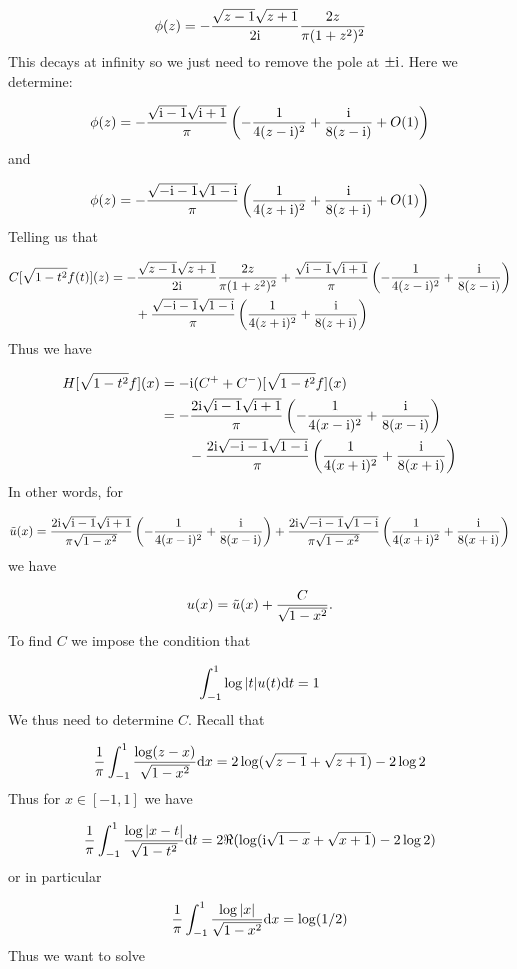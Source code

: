 \documentclass[12pt,landscape]{article}
\def\D{ {\rm d} }
\def\I{ {\rm i} }
\def\addtab#1={#1\;&=}
\def\ccr{\\\addtab}
\def\dx{\D x}
\def\dt{\D t}
\def\addtab#1={#1\;&=}
\def\ccr{\\\addtab}
\begin{document}
{\[
\phi(z) = -{\sqrt{z-1} \sqrt{z+1} \over 2 \I} {2 z \over \pi (1+z^2)^2}
\]
This decays at infinity so we just need to remove the pole at $\pm \I$. Here we determine:

\[
\phi(z) = -{\sqrt{\I -1 } \sqrt{\I + 1} \over \pi} \left(-{1  \over 4 (z-\I)^2}  + {\I \over 8  (z-\I)} + O(1) \right)
\]
and

\[
\phi(z) = -{\sqrt{-\I -1 } \sqrt{1-\I } \over \pi} \left({1  \over 4 (z+\I)^2}  + {\I \over 8  (z+\I)} + O(1) \right)
\]
Telling us that


\begin{align*}
C[\sqrt{1-t^2} f(t)](z) &=  -{\sqrt{z-1} \sqrt{z+1} \over 2 \I} {2 z \over \pi (1+z^2)^2} +  {\sqrt{\I -1 } \sqrt{\I + 1} \over \pi} \left(-{1  \over 4 (z-\I)^2}  + {\I \over 8  (z-\I)} \right) \\
&\qquad+  {\sqrt{-\I -1 } \sqrt{1-\I } \over \pi} \left({1  \over 4 (z+\I)^2}  + {\I \over 8  (z+\I)} \right)
\end{align*}
Thus we have


\begin{align*}
H[\sqrt{1-t^2} f](x) &= -\I (C^+ + C^-)[\sqrt{1-t^2} f](x) \ccr
= -  {2\I \sqrt{\I -1 } \sqrt{\I + 1} \over \pi} \left(-{1  \over 4 (x-\I)^2}  + {\I \over 8  (x-\I)} \right) \\
&\qquad-  {2\I \sqrt{-\I -1 } \sqrt{1-\I } \over \pi} \left({1  \over 4 (x+\I)^2}  + {\I \over 8  (x+\I)} \right)
\end{align*}
In other words, for

\[
\tilde u(x) = {2\I \sqrt{\I -1 } \sqrt{\I + 1} \over \pi \sqrt{1-x^2}} \left(-{1  \over 4 (x-\I)^2}  + {\I \over 8  (x-\I)} \right) +  {2\I \sqrt{-\I -1 } \sqrt{1-\I } \over \pi \sqrt{1-x^2}} \left({1  \over 4 (x+\I)^2}  + {\I \over 8  (x+\I)} \right)
\]
we have

\[
u(x) =  \tilde u(x) + {C \over \sqrt{1-x^2}}.
\]
To find $C$ we impose the condition that

\[
\int_{-1}^1 \log|t| u(t) \dt = 1
\]
We thus need to determine $C$. Recall that

\[
{1 \over \pi} \int_{-1}^1 {\log(z-x) \over \sqrt{1-x^2}} \dx = 2 \log(\sqrt{z-1}+\sqrt{z+1}) - 2 \log 2
\]
Thus for $x \in [-1,1]$ we have

\[
{1 \over \pi} \int_{-1}^1 {\log|x-t| \over \sqrt{1-t^2}} \dt = 2 \Re(\log(\I \sqrt{1-x}+\sqrt{x+1}) - 2 \log 2)
\]
or in particular

\[
{1 \over \pi} \int_{-1}^1 {\log|x| \over \sqrt{1-x^2}} \dx = \log(1/2)
\]
Thus we want to solve

}
\end{document}
